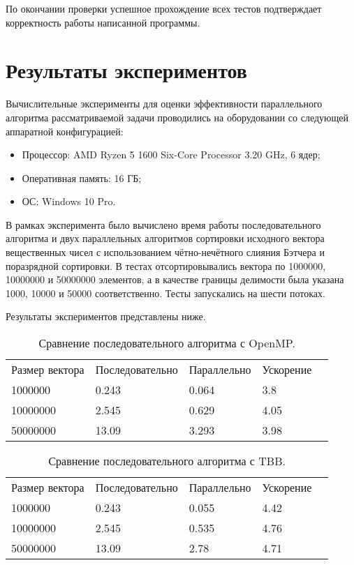 \documentclass{report}
\begin{document}
\par По окончании проверки успешное прохождение всех тестов подтверждает корректность работы написанной программы.
\newpage

\section*{Результаты экспериментов}
Вычислительные эксперименты для оценки эффективности параллельного алгоритма рассматриваемой задачи проводились на оборудовании со следующей аппаратной конфигурацией:

\begin{itemize}
\item Процессор: AMD Ryzen 5 1600 Six-Core Processor 3.20 GHz, 6 ядер;
\item Оперативная память: 16 ГБ;
\item ОС: Windows 10 Pro.
\end{itemize}

\par В рамках эксперимента было вычислено время работы последовательного алгоритма и двух параллельных алгоритмов сортировки исходного вектора вещественных чисел с использованием чётно-нечётного слияния Бэтчера и поразрядной сортировки. В тестах отсортировывались вектора по 1000000, 10000000 и 50000000 элементов, а в качестве границы делимости была указана 1000, 10000 и 50000 соответственно. Тесты запускались на шести потоках.
\par Результаты экспериментов представлены ниже.

\begin{table}[!h]
\caption{Сравнение последовательного алгоритма с OpenMP.}
\centering
\begin{tabular}{lllll}
Размер вектора & Последовательно & Параллельно & Ускорение  \\
1000000        & 0.243         & 0.064     & 3.8       \\
10000000        & 2.545         & 0.629     & 4.05       \\
50000000       & 13.09         & 3.293     & 3.98       
\end{tabular}
\end{table}

\begin{table}[!h]
\caption{Сравнение последовательного алгоритма с TBB.}
\centering
\begin{tabular}{lllll}
Размер вектора & Последовательно & Параллельно & Ускорение  \\
1000000        & 0.243         & 0.055     & 4.42       \\
10000000        & 2.545         & 0.535     & 4.76       \\
50000000       & 13.09         & 2.78     & 4.71       
\end{tabular}
\end{table}
\end{document}
